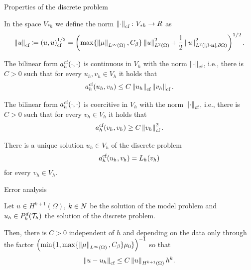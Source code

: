 	\begin{frame}[allowframebreaks]{Properties of the discrete problem}
	\begin{definicion}
		In the space $V_{*h}$ we define the norm $\left\|\cdot\right\|_{\text{cf}}\colon V_{*h}\to\relax R$ as {\small $$\left\|u\right\|_{\text{cf}}\coloneqq\left(u,u\right)_\text{cf}^{1/2}= \left(\max\{\left\|\mu\right\|_{L^\infty(\Omega)},C_\beta\}\left\|u\right\|_{L^2(\Omega)}^2+\frac{1}{2}\left\|u\right\|_{L^2(|\beta\cdot\mathbf{n}|;\partial\Omega)}^2\right)^{1/2}.$$}
	\end{definicion}
	\framebreak
	\begin{lemma}
		The bilinear form $a_h^{\text{cf}}(\cdot,\cdot)$ is continuous in $V_h$ with the norm $\left\|\cdot\right\|_{\text{cf}}$, i.e., there is $C>0$ such that for every $u_h,v_h\in V_h$ it holds that $$a_h^{\text{cf}}(u_h,v_h)\leq C\left\|u_h\right\|_{\text{cf}}\left\|v_h\right\|_{\text{cf}}.$$
	\end{lemma}
	
	\begin{lemma}
		The bilinear form $a_h^{\text{cf}}(\cdot,\cdot)$ is coercitive in $V_h$ with the norm $\left\|\cdot\right\|_{\text{cf}}$, i.e., there is $C>0$ such that for every $v_h\in V_h$ it holds that $$a_h^{\text{cf}}(v_h,v_h)\geq C\left\|v_h\right\|_{\text{cf}}^2.$$
	\end{lemma}
	\framebreak
	\begin{lemma}
		There is a unique solution $u_h\in V_h$ of the discrete problem $$a_h^{\text{cf}}(u_h,v_h)=L_h(v_h)$$ for every $v_h\in V_h$.
	\end{lemma}
	
	\end{frame}
	
	\begin{frame}{Error analysis}
	\begin{theorem}
		\label{theorem:hiperbolico_CF_orden_norma_CF}
		Let $u\in H^{k+1}(\Omega)$, $k\in\relax N$ be the solution of the model problem and $u_h\in \relax{P}_k^d(\mathcal{T}_h)$ the solution of the discrete problem.
		
		Then, there is $C>0$ independent of $h$ and depending on the data only through the factor $\left(\min\{1,\max\{\left\|\mu\right\|_{L^\infty(\Omega)},C_\beta\}\mu_0\}\right)^{-1}$ so that
		\begin{equation*}
		\label{theorem:orden_convergencia_CF}
		\left\|u-u_h\right\|_{\text{cf}}\leq C\left\|u\right\|_{H^{k+1}(\Omega)}h^k.
		\end{equation*}
	\end{theorem}
	\end{frame}
	
